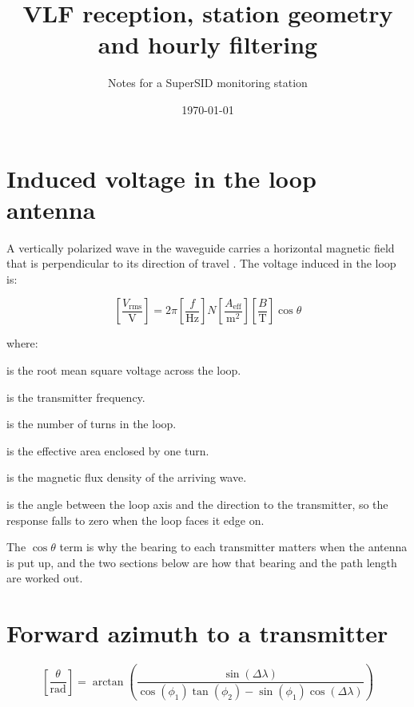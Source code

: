 \documentclass[11pt,a4paper]{article}
\title{VLF reception, station geometry and hourly filtering}
\author{Notes for a SuperSID monitoring station}
\date{\today}
\begin{document}
\maketitle

\section{Induced voltage in the loop antenna}

A vertically polarized wave in the waveguide carries a horizontal magnetic
field that is perpendicular to its direction of travel \citep{loudet2013}. The
voltage induced in the loop is:

\begin{equation}
     \left [\frac{V_{\mathrm{rms}}}{\mathrm{V}} \right ]= 2\pi \left[ \frac{f}{\mathrm{Hz}} \right] N \left[ \frac{A_{\mathrm{eff}}}{\mathrm{m}^2} \right] \left[ \frac{B}{\mathrm{T}} \right] \cos\theta
    \label{eq:faraday}
\end{equation}

where:
\begin{description}[itemsep=2pt,topsep=2pt]
    \item[$-$ $V_{\mathrm{rms}}$] is the root mean square voltage across the loop.
    \item[$-$ $f$] is the transmitter frequency.
    \item[$-$ $N$] is the number of turns in the loop.
    \item[$-$ $A_{\mathrm{eff}}$] is the effective area enclosed by one turn.
    \item[$-$ $B$] is the magnetic flux density of the arriving wave.
    \item[$-$ $\theta$] is the angle between the loop axis and the direction to
        the transmitter, so the response falls to zero when the loop faces it
        edge on.
\end{description}

The $\cos\theta$ term is why the bearing to each transmitter matters when the
antenna is put up, and the two sections below are how that bearing and the path
length are worked out.

\section{Forward azimuth to a transmitter}

\begin{equation}
    \left [\frac{\theta}{\mathrm{rad}}\right] = \arctan \left( \frac{\sin(\Delta\lambda)}{\cos(\phi_1)\tan(\phi_2) - \sin(\phi_1)\cos(\Delta\lambda)} \right)
    \label{eq:azimuth}
\end{equation}
\end{document}

